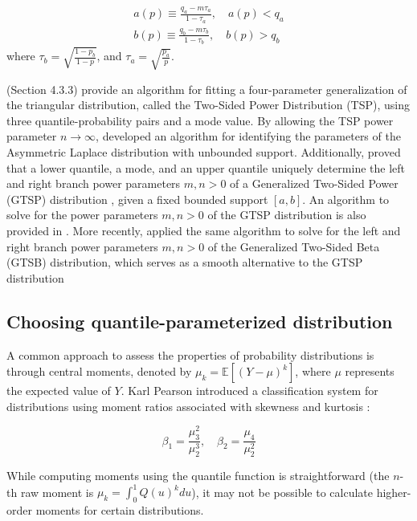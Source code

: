 \documentclass[
  fleqn,
  deca,
  blindrev
]{informs4}
\begin{document}
\[
\begin{gathered}
a(p) \equiv \frac{q_a-m\tau_a}{1-\tau_a}, \quad a(p)<q_a\\
b(p) \equiv \frac{q_b-m\tau_b}{1-\tau_b}, \quad b(p)>q_b
\end{gathered}
\] where \(\tau_b=\sqrt{\frac{1-p_b}{1-p}}\), and
\(\tau_a=\sqrt{\frac{p_a}{p}}\).

\citet{kotz2004BetaOtherContinuous} (Section 4.3.3) provide an algorithm
for fitting a four-parameter generalization of the triangular
distribution, called the Two-Sided Power Distribution (TSP), using three
quantile-probability pairs and a mode value. \textcolor[HTML]{ff0000}{By
allowing the TSP power parameter \(n \rightarrow \infty\),
\citet{kotz2005LinkTwosidedPower} developed an algorithm for identifying
the parameters of the Asymmetric Laplace distribution with unbounded
support. Additionally, \citet{vandorp2021ThreepointLifetimeDistribution}
proved that a lower quantile, a mode, and an upper quantile uniquely
determine the left and right branch power parameters \(m, n > 0\) of a
Generalized Two-Sided Power (GTSP) distribution
\citep{herrerias-velasco2009GeneralizedTwosidedPower}, given a fixed
bounded support \([a, b]\). An algorithm to solve for the power
parameters \(m, n > 0\) of the GTSP distribution is also provided in
\citet{vandorp2021ThreepointLifetimeDistribution}. More recently,
\citet{vandorp2023GeneralizedTwosidedBeta} applied the same algorithm to
solve for the left and right branch power parameters \(m, n > 0\) of the
Generalized Two-Sided Beta (GTSB) distribution, which serves as a smooth
alternative to the GTSP distribution}

\subsection{Choosing quantile-parameterized
distribution}\label{sec-compareqf}

A common approach to assess the properties of probability distributions
is through central moments, denoted by \(\mu_k=\mathbb{E}[(Y-\mu)^k]\),
where \(\mu\) represents the expected value of \(Y\). Karl Pearson
introduced a classification system for distributions using moment ratios
associated with skewness and kurtosis
\citep{fiori2009KarlPearsonOrigin}:

\[
\beta_1=\frac{\mu_3^2}{\mu_2^3},\quad \beta_2=\frac{\mu_4}{\mu_2^2}
\]

While computing moments using the quantile function is straightforward
(the \(n\)-th raw moment is \(\mu_k=\int_0^1 Q(u)^k du\)), it may not be
possible to calculate higher-order moments for certain distributions.
\end{document}
